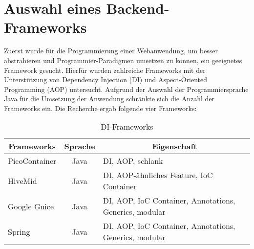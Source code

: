 

\section{Auswahl eines Backend-Frameworks}
Zuerst wurde für die Programmierung einer Webanwendung, um besser abstrahieren und Programmier-Paradigmen umsetzen zu können, ein geeignetes Framework gesucht. 
Hierfür wurden zahlreiche Frameworks mit der Unterstützung von  Dependency Injection (DI) und Aspect-Oriented Programming (AOP) untersucht.
Aufgrund der Auswahl der Programmiersprache Java für die Umsetzung der Anwendung schränkte sich die Anzahl der Frameworks ein.
Die Recherche ergab folgende vier Frameworks:

\begin{table}[h!]
	\centering
	
	\begin{tabularx}{\textwidth}{|l|c|X|}
		
		\hline
		\multicolumn{1}{|c|}{{\textbf{Frameworks}}} & \multicolumn{1}{c|}{{\textbf{Sprache}}} & \multicolumn{1}{c|}{{\textbf{Eigenschaft}}} \\
		\hline	     
		PicoContainer & Java & DI, AOP, schlank\\
		
		HiveMid & Java & DI, AOP-ähnliches Feature, IoC Container \\
		
		Google Guice & Java & DI, AOP, IoC Container,  Annotations, Generics, modular\\
		
		Spring & Java & DI, AOP, IoC Container,  Annotations, Generics, modular\\
		\hline
	\end{tabularx}
	\caption{DI-Frameworks}
	\label{tbl:diFrameworks}
\end{table}

